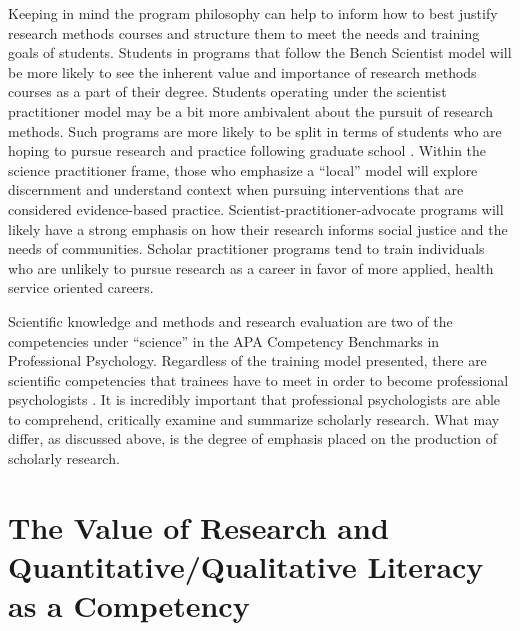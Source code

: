 \documentclass[
  11pt,
]{book}
\begin{document}
Keeping in mind the program philosophy can help to inform how to best justify research methods courses and structure them to meet the needs and training goals of students. Students in programs that follow the Bench Scientist model will be more likely to see the inherent value and importance of research methods courses as a part of their degree. Students operating under the scientist practitioner model may be a bit more ambivalent about the pursuit of research methods. Such programs are more likely to be split in terms of students who are hoping to pursue research and practice following graduate school \citep{deangelis_three_2003}. Within the science practitioner frame, those who emphasize a ``local'' model will explore discernment and understand context when pursuing interventions that are considered evidence-based practice. Scientist-practitioner-advocate programs will likely have a strong emphasis on how their research informs social justice and the needs of communities. Scholar practitioner programs tend to train individuals who are unlikely to pursue research as a career in favor of more applied, health service oriented careers.

Scientific knowledge and methods and research evaluation are two of the competencies under ``science'' in the APA Competency Benchmarks in Professional Psychology. Regardless of the training model presented, there are scientific competencies that trainees have to meet in order to become professional psychologists . It is incredibly important that professional psychologists are able to comprehend, critically examine and summarize scholarly research. What may differ, as discussed above, is the degree of emphasis placed on the production of scholarly research.

\section{The Value of Research and Quantitative/Qualitative Literacy as a Competency}\label{the-value-of-research-and-quantitativequalitative-literacy-as-a-competency}
\end{document}
